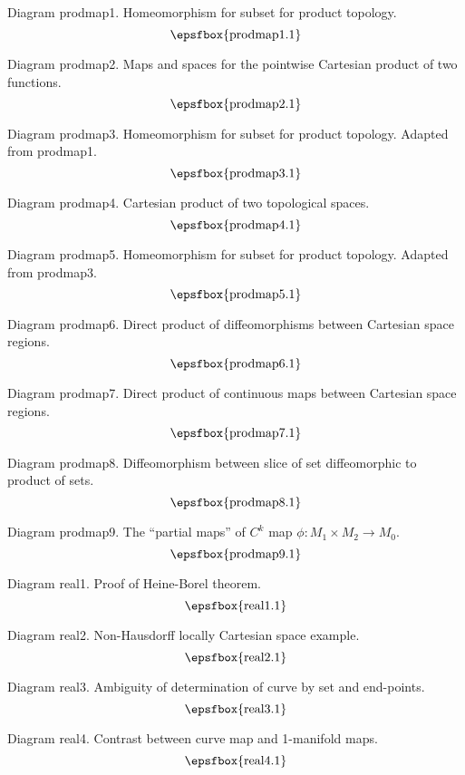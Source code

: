 \secteject
\edef\SECTprodmap{\the\pageno}

Diagram prodmap1. Homeomorphism for subset for product topology.
$$
\centerline{\epsfbox{prodmap1.1}}
$$

Diagram prodmap2. Maps and spaces for the pointwise Cartesian product of two
functions.
$$
\centerline{\epsfbox{prodmap2.1}}
$$

Diagram prodmap3. Homeomorphism for subset for product topology. Adapted from
prodmap1.
$$
\centerline{\epsfbox{prodmap3.1}}
$$

Diagram prodmap4. Cartesian product of two topological spaces.
$$
\centerline{\epsfbox{prodmap4.1}}
$$

\filleject

Diagram prodmap5. Homeomorphism for subset for product topology. Adapted from
prodmap3.
$$
\centerline{\epsfbox{prodmap5.1}}
$$

Diagram prodmap6. Direct product of diffeomorphisms between Cartesian space
regions.
$$
\centerline{\epsfbox{prodmap6.1}}
$$

Diagram prodmap7. Direct product of continuous maps between Cartesian space
regions.
$$
\centerline{\epsfbox{prodmap7.1}}
$$

\filleject

Diagram prodmap8. Diffeomorphism between slice of set diffeomorphic to product
of sets.
$$
\centerline{\epsfbox{prodmap8.1}}
$$

Diagram prodmap9. The ``partial maps'' of $C^k$ map $\phi:M_1\times M_2\to M_0$.
$$
\centerline{\epsfbox{prodmap9.1}}
$$

\secteject
\edef\SECTreal{\the\pageno}

Diagram real1. Proof of Heine-Borel theorem.
$$
\centerline{\epsfbox{real1.1}}
$$

Diagram real2. Non-Hausdorff locally Cartesian space example.
$$
\centerline{\epsfbox{real2.1}}
$$

Diagram real3. Ambiguity of determination of curve by set and end-points.
$$
\centerline{\epsfbox{real3.1}}
$$

Diagram real4. Contrast between curve map and 1-manifold maps.
$$
\centerline{\epsfbox{real4.1}}
$$

